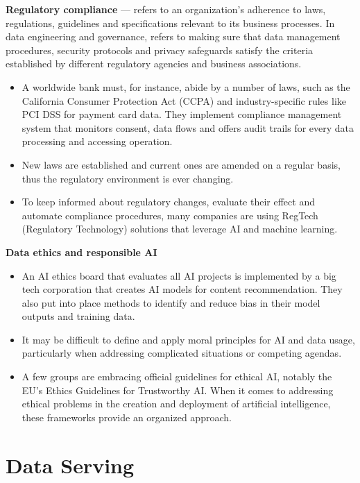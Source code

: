 \textbf{Regulatory compliance} — refers to an organization's adherence to laws, regulations, guidelines and specifications relevant to its business processes. In data engineering and governance, refers to making sure that data management procedures, security protocols and privacy safeguards satisfy the criteria established by different regulatory agencies and business associations.

\begin{itemize}
    \item A worldwide bank must, for instance, abide by a number of laws, such as the California Consumer Protection Act (CCPA) and industry-specific rules like PCI DSS for payment card data. They implement compliance management system that monitors consent, data flows and offers audit trails for every data processing and accessing operation.
    \item New laws are established and current ones are amended on a regular basis, thus the regulatory environment is ever changing.
    \item To keep informed about regulatory changes, evaluate their effect and automate compliance procedures, many companies are using RegTech (Regulatory Technology) solutions that leverage AI and machine learning.
\end{itemize}

\textbf{Data ethics and responsible AI}

\begin{itemize}
    \item An AI ethics board that evaluates all AI projects is implemented by a big tech corporation that creates AI models for content recommendation. They also put into place methods to identify and reduce bias in their model outputs and training data.
    \item It may be difficult to define and apply moral principles for AI and data usage, particularly when addressing complicated situations or competing agendas.
    \item A few groups are embracing official guidelines for ethical AI, notably the EU's Ethics Guidelines for Trustworthy AI. When it comes to addressing ethical problems in the creation and deployment of artificial intelligence, these frameworks provide an organized approach.
\end{itemize}

\section{Data Serving}

